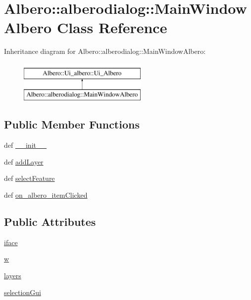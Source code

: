 \hypertarget{classAlbero_1_1alberodialog_1_1MainWindowAlbero}{
\section{Albero::alberodialog::MainWindowAlbero Class Reference}
\label{classAlbero_1_1alberodialog_1_1MainWindowAlbero}
}
Inheritance diagram for Albero::alberodialog::MainWindowAlbero:\begin{figure}[H]
\begin{center}
\leavevmode
\includegraphics[height=2.000000cm]{classAlbero_1_1alberodialog_1_1MainWindowAlbero}
\end{center}
\end{figure}
\subsection*{Public Member Functions}
\begin{DoxyCompactItemize}
\item 
def \hyperlink{classAlbero_1_1alberodialog_1_1MainWindowAlbero_a8f282eb3763b3a84727916669f66f9cd}{\_\-\_\-init\_\-\_\-}
\item 
def \hyperlink{classAlbero_1_1alberodialog_1_1MainWindowAlbero_a6c214944c455d39ac630d1a8f626c65a}{addLayer}
\item 
def \hyperlink{classAlbero_1_1alberodialog_1_1MainWindowAlbero_a4d433cb089813a2debcfdbdb765fde7c}{selectFeature}
\item 
def \hyperlink{classAlbero_1_1alberodialog_1_1MainWindowAlbero_aa92b436eb96ab591808b0fed601ac10a}{on\_\-albero\_\-itemClicked}
\end{DoxyCompactItemize}
\subsection*{Public Attributes}
\begin{DoxyCompactItemize}
\item 
\hyperlink{classAlbero_1_1alberodialog_1_1MainWindowAlbero_a224abd446e2f31c75acc99a60589b848}{iface}
\item 
\hyperlink{classAlbero_1_1alberodialog_1_1MainWindowAlbero_a6a3c16f44c71d872fee6098058193258}{w}
\item 
\hyperlink{classAlbero_1_1alberodialog_1_1MainWindowAlbero_a30398e2a1ada87fae4e66cc178b963da}{layers}
\item 
\hyperlink{classAlbero_1_1alberodialog_1_1MainWindowAlbero_a5a791ae750aba00f46644a451d188f86}{selectionGui}
\end{DoxyCompactItemize}


